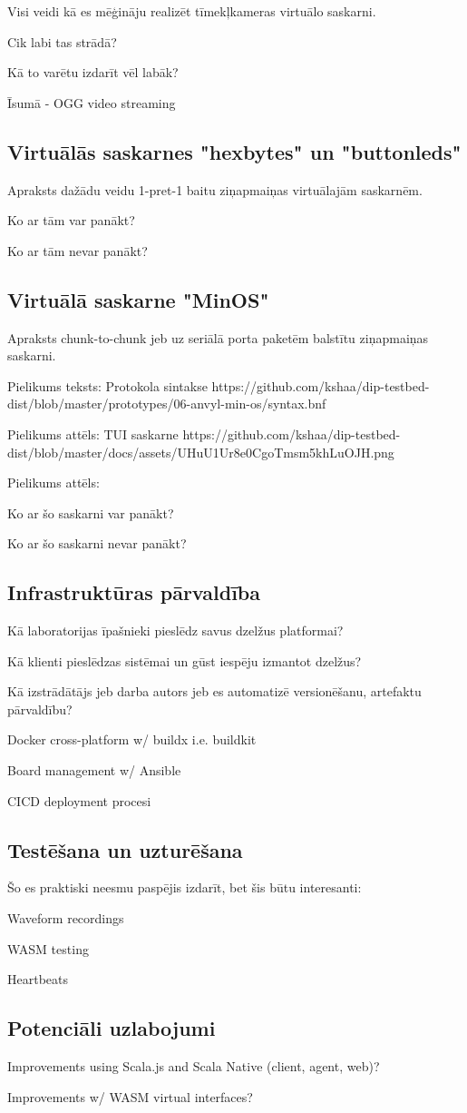 Visi veidi kā es mēģināju realizēt tīmekļkameras virtuālo saskarni.

Cik labi tas strādā?

Kā to varētu izdarīt vēl labāk?

Īsumā - OGG video streaming

\subsection{Virtuālās saskarnes "hexbytes" un "buttonleds"}

Apraksts dažādu veidu 1-pret-1 baitu ziņapmaiņas virtuālajām saskarnēm.

Ko ar tām var panākt?

Ko ar tām nevar panākt?

\subsection{Virtuālā saskarne "MinOS"}

Apraksts chunk-to-chunk jeb uz seriālā porta paketēm balstītu ziņapmaiņas saskarni.

Pielikums teksts: Protokola sintakse https://github.com/kshaa/dip-testbed-dist/blob/master/prototypes/06-anvyl-min-os/syntax.bnf  

Pielikums attēls: TUI saskarne https://github.com/kshaa/dip-testbed-dist/blob/master/docs/assets/UHuU1Ur8e0CgoTmsm5khLuOJH.png

Pielikums attēls: 

Ko ar šo saskarni var panākt?

Ko ar šo saskarni nevar panākt?

\subsection{Infrastruktūras pārvaldība}

Kā laboratorijas īpašnieki pieslēdz savus dzelžus platformai?

Kā klienti pieslēdzas sistēmai un gūst iespēju izmantot dzelžus?

Kā izstrādātājs jeb darba autors jeb es automatizē versionēšanu, artefaktu pārvaldību?

Docker cross-platform w/ buildx i.e. buildkit

Board management w/ Ansible

CICD deployment procesi

\subsection{Testēšana un uzturēšana}

Šo es praktiski neesmu paspējis izdarīt, bet šis būtu interesanti:

Waveform recordings

WASM testing

Heartbeats

\subsection{Potenciāli uzlabojumi}

Improvements using Scala.js and Scala Native (client, agent, web)?

Improvements w/ WASM virtual interfaces?
